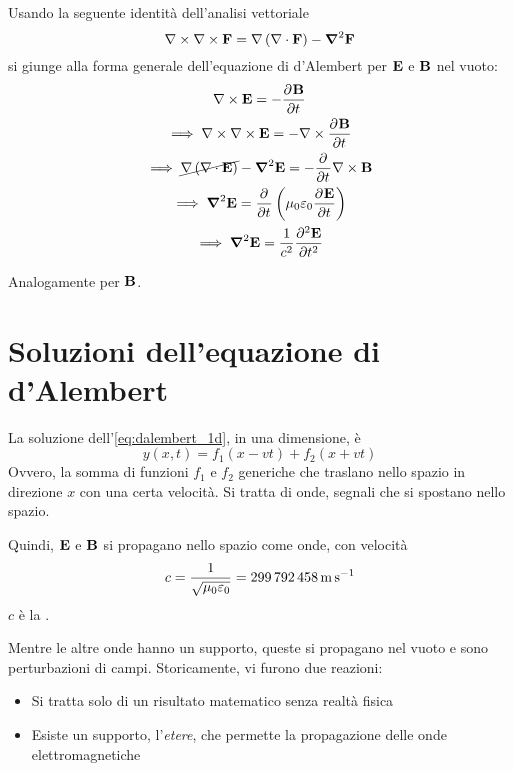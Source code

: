 Usando la seguente identità dell'analisi vettoriale
\begin{equation}
    \nabla \times \nabla \times \mathbf{F} = \nabla \left( \nabla \cdot \mathbf{F} \right) - \boldsymbol{\nabla}^2 \mathbf{F}
\end{equation}
si giunge alla forma generale dell'equazione di d'Alembert per $\mathbf{E}$ e $\mathbf{B}$ nel vuoto:
\begin{gather}
    \curl \E = - \parder[\B]{t} \\
    \implies
    \curl \curl \E = - \curl \parder[\B]{t} \\
    \implies
    \cancel{\grad \pts{\diver \E}} - \vlapl \E = - \parder{t} \curl \B \\
    \implies
    \vlapl \E = \parder{t} \pts{\mu_0 \eps_0 \parder[\E]{t}} \\
    \implies
    \vlapl \E = \frac{1}{c^2} \parder[\E][2]{t}
\end{gather}

Analogamente per $\mathbf{B}$.

\section{Soluzioni dell'equazione di d'Alembert}

La soluzione dell'\cref{eq:dalembert_1d}, in una dimensione, è
\begin{equation}
    y(x, t) = f_1(x - vt) + f_2(x + vt)
\end{equation}
Ovvero, la somma di funzioni $f_1$ e $f_2$ generiche che traslano nello spazio in direzione $x$ con una certa velocità.
Si tratta di onde, segnali che si spostano nello spazio.

Quindi, $\mathbf{E}$ e $\mathbf{B}$ si propagano nello spazio come onde, con velocità
\begin{equation}
    c = \frac{1}{\sqrt{\mu_0 \varepsilon_0}} = \qty{299792458}{\metre\per\second}
\end{equation}
$c$ è la .

Mentre le altre onde hanno un supporto, queste si propagano nel vuoto e sono perturbazioni di campi.
Storicamente, vi furono due reazioni:
\begin{itemize}
    \item Si tratta solo di un risultato matematico senza realtà fisica
    \item Esiste un supporto, l'\textit{etere}, che permette la propagazione delle onde elettromagnetiche
\end{itemize}

